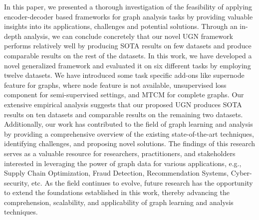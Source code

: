 In this paper, we presented a thorough investigation of the feasibility of applying encoder-decoder based frameworks for graph analysis tasks by providing valuable insights into its applications, challenges and potential solutions. Through an in-depth analysis, we can conclude concretely that our novel UGN framework performs relatively well by producing SOTA results on few datasets and produce comparable results on the rest of the datasets. In this work, we have developed a novel generalized framework and evaluated it on six different tasks by employing twelve datasets. We have introduced some task specific add-ons like supernode feature for graphs, where node feature is not available, unsupervised loss component for semi-supervised settings, and MTCM for complete graphs. Our extensive empirical analysis suggests that our proposed UGN produces SOTA results on ten datasets and comparable results on the remaining two datasets. Additionally, our work has contributed to the field of graph learning and analysis by providing a comprehensive overview of the existing state-of-the-art techniques, identifying challenges, and proposing novel solutions. The findings of this research serves as a valuable resource for researchers, practitioners, and stakeholders interested in leveraging the power of graph data for various applications, e.g., Supply Chain Optimization, Fraud Detection, Recommendation Systems, Cyber-security, etc. As the field continues to evolve, future research has the opportunity to extend the foundations established in this work, thereby advancing the comprehension, scalability, and applicability of graph learning and analysis techniques.




